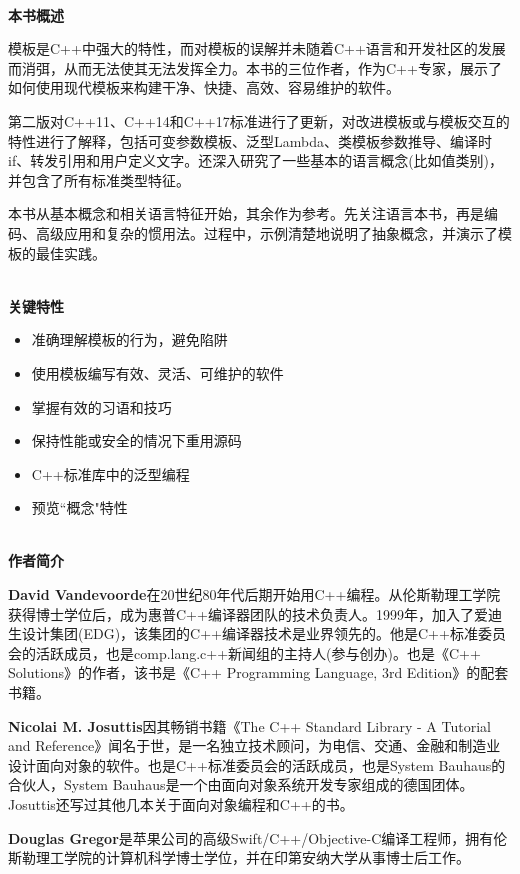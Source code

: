 \documentclass[11pt,a4paper,UTF8]{book}
\begin{document}
\begin{sloppypar}
	\hspace*{\fill} \\ %
	\noindent\textbf{本书概述}
	
	模板是C++中强大的特性，而对模板的误解并未随着C++语言和开发社区的发展而消弭，从而无法使其无法发挥全力。本书的三位作者，作为C++专家，展示了如何使用现代模板来构建干净、快捷、高效、容易维护的软件。
	
	第二版对C++11、C++14和C++17标准进行了更新，对改进模板或与模板交互的特性进行了解释，包括可变参数模板、泛型Lambda、类模板参数推导、编译时if、转发引用和用户定义文字。还深入研究了一些基本的语言概念(比如值类别)，并包含了所有标准类型特征。
	
	本书从基本概念和相关语言特征开始，其余作为参考。先关注语言本书，再是编码、高级应用和复杂的惯用法。过程中，示例清楚地说明了抽象概念，并演示了模板的最佳实践。
	
	\hspace*{\fill} \\ %
	\noindent\textbf{关键特性}
	\begin{itemize}
	\item 准确理解模板的行为，避免陷阱
	\item 使用模板编写有效、灵活、可维护的软件
	\item 掌握有效的习语和技巧
	\item 保持性能或安全的情况下重用源码
	\item C++标准库中的泛型编程
	\item 预览“概念"特性
	\end{itemize}
	
	\hspace*{\fill} \\ %
	\noindent\textbf{作者简介}
	
	\textbf{David Vandevoorde}在20世纪80年代后期开始用C++编程。从伦斯勒理工学院获得博士学位后，成为惠普C++编译器团队的技术负责人。1999年，加入了爱迪生设计集团(EDG)，该集团的C++编译器技术是业界领先的。他是C++标准委员会的活跃成员，也是comp.lang.c++新闻组的主持人(参与创办)。也是《C++ Solutions》的作者，该书是《C++ Programming Language, 3rd Edition》的配套书籍。
	
	\textbf{Nicolai M. Josuttis}因其畅销书籍《The C++ Standard Library - A Tutorial and Reference》闻名于世，是一名独立技术顾问，为电信、交通、金融和制造业设计面向对象的软件。也是C++标准委员会的活跃成员，也是System Bauhaus的合伙人，System Bauhaus是一个由面向对象系统开发专家组成的德国团体。Josuttis还写过其他几本关于面向对象编程和C++的书。
	
	\textbf{Douglas Gregor}是苹果公司的高级Swift/C++/Objective-C编译工程师，拥有伦斯勒理工学院的计算机科学博士学位，并在印第安纳大学从事博士后工作。
	

\end{sloppypar}
\end{document}
